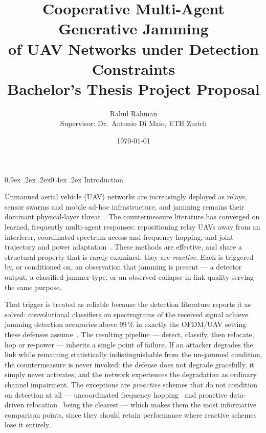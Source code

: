 \documentclass[10pt,a4paper]{article}
\title{\vspace{-1.5em}\textbf{Cooperative Multi-Agent Generative Jamming\\
of UAV Networks under Detection Constraints}\\[0.3em]
\normalsize Bachelor's Thesis Project Proposal}
\author{\normalsize Rahul Rahman \\[-0.2em]
\small Supervisor: Dr.\ Antonio Di Maio, ETH Zurich}
\date{\small\today}
\makeatletter
\renewcommand\section{\@startsection{section}{1}{\z@}%
  {0.9ex \@plus .2ex \@minus .2ex}{0.4ex \@plus .2ex}%
  {\normalfont\large\bfseries}}
\makeatother
\begin{document}
\maketitle
\vspace{-2em}

\section{Introduction}

Unmanned aerial vehicle (UAV) networks are increasingly deployed as relays, sensor swarms and
mobile ad-hoc infrastructure, and jamming remains their dominant physical-layer
threat~\cite{pirayesh2022survey}. The countermeasure literature has converged on learned,
frequently multi-agent responses: repositioning relay UAVs away from an interferer, coordinated
spectrum access and frequency hopping, and joint trajectory and power
adaptation~\cite{nguyen2025marl,abolhassani2025coordinated}. These methods are effective, and
share a structural property that is rarely examined: they are \emph{reactive}. Each is triggered
by, or conditioned on, an observation that jamming is present --- a detector output, a classified
jammer type, or an observed collapse in link quality serving the same purpose.

That trigger is treated as reliable because the detection literature reports it as solved:
convolutional classifiers on spectrograms of the received signal achieve jamming detection
accuracies above 99\,\% in exactly the OFDM/UAV setting these defenses
assume~\cite{li2022jamming}. The resulting pipeline --- detect, classify, then relocate, hop or
re-power --- inherits a single point of failure. If an attacker degrades the link while remaining
statistically indistinguishable from the un-jammed condition, the countermeasure is never
invoked: the defense does not degrade gracefully, it simply never activates, and the network
experiences the degradation as ordinary channel impairment. The exceptions are \emph{proactive}
schemes that do not condition on detection at all --- uncoordinated frequency
hopping~\cite{strasser2009novel} and proactive data-driven
relocation~\cite{leuenberger2025proactive} being the clearest --- which makes them the most
informative comparison points, since they should retain performance where reactive schemes lose
it entirely.
\end{document}
